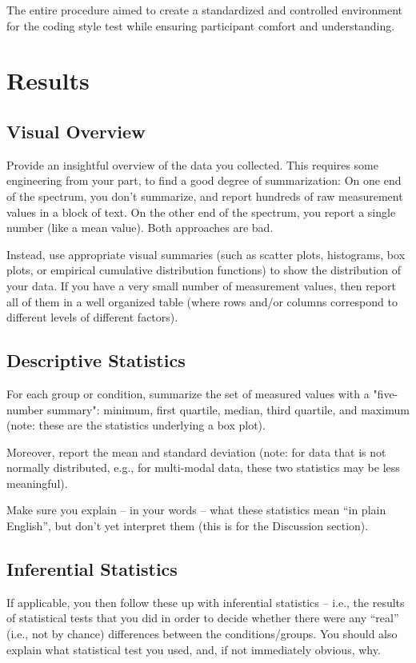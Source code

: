 \documentclass{article}
\begin{document}
The entire procedure aimed to create a standardized and controlled environment for the coding style test while ensuring participant comfort and understanding.


\section{Results}
\subsection{Visual Overview}
Provide an insightful overview of the data you collected. This requires some engineering from your part, to find a good degree of summarization: On one end of the spectrum, you don't summarize, and report hundreds of raw measurement values in a block of text. On the other end of the spectrum, you report a single number (like a mean value). Both approaches are bad.

Instead, use appropriate visual summaries (such as scatter plots, histograms, box plots, or empirical cumulative distribution functions) to show the distribution of your data. If you have a very small number of measurement values, then report all of them in a well organized table (where rows and/or columns correspond to different levels of different factors).


\subsection{Descriptive Statistics}

For each group or condition, summarize the set of measured values with a "five-number summary": minimum, first quartile, median, third quartile, and maximum (note: these are the statistics underlying a box plot).

Moreover, report the mean and standard deviation (note: for data that is not normally distributed, e.g., for multi-modal data, these two statistics may be less meaningful).

Make sure you explain – in your words – what these statistics mean “in plain English”, but don’t yet interpret them (this is for the Discussion section).

\subsection{Inferential Statistics}
If applicable, you then follow these up with inferential statistics – i.e., the results of statistical tests that you did in order to decide whether there were any “real” (i.e., not by chance) differences between the conditions/groups. You should also explain what statistical test you used, and, if not immediately obvious, why.
\end{document}
